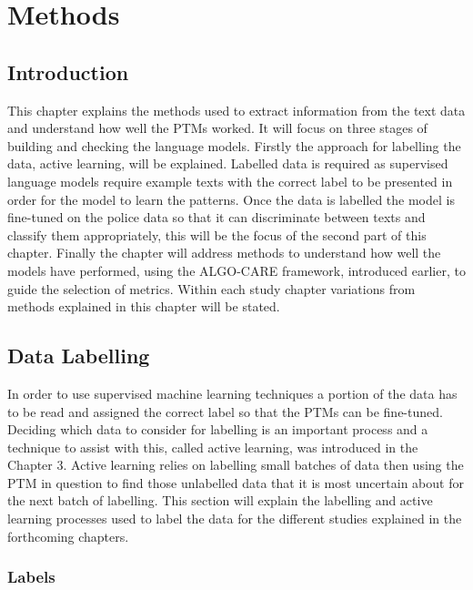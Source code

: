 \chapter{Methods}

\section{Introduction}
This chapter  explains the methods used to extract information from the text data and understand how well the PTMs worked.  It will focus on three stages of  building and checking the language models. Firstly the approach for labelling the data, active learning, will be explained. Labelled data is required as supervised language models require example texts with the correct label to be presented  in order for the model to learn the patterns. Once the data is labelled the model is fine-tuned on the police data so that it can discriminate between texts and classify them appropriately, this will be the focus of the second part of this chapter. Finally the chapter will address methods to understand how well the models have performed, using the ALGO-CARE framework, introduced earlier, to guide the selection of metrics. Within each study chapter variations from methods explained in this chapter will be stated. 

\section{Data Labelling} In order to use supervised machine learning techniques a portion of the data has to be read and assigned the correct label so that the PTMs can be fine-tuned. Deciding which data to consider for labelling is an important process and a technique to assist with this,  called active learning, was introduced in the Chapter 3. Active learning relies on labelling small batches of data then using the PTM in question to find those unlabelled data that it is most uncertain about for the next batch of labelling. This section will explain the labelling and active learning processes used to label the data for the different studies explained in the forthcoming chapters.

\subsection{Labels}


